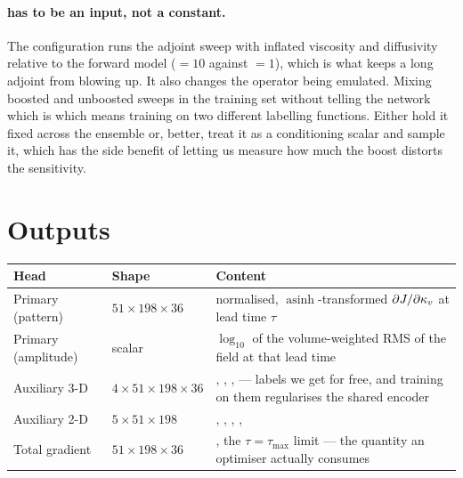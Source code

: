 \paragraph{ has to be an input, not a constant.}
The  configuration runs the adjoint sweep with inflated
viscosity and diffusivity relative to the forward model
(${}=10$ against ${}=1$), which is what
keeps a long adjoint from blowing up. It also changes the operator being
emulated. Mixing boosted and unboosted sweeps in the training set without
telling the network which is which means training on two different labelling
functions. Either hold it fixed across the ensemble or, better, treat it as a
conditioning scalar and sample it, which has the side benefit of letting us
measure how much the boost distorts the sensitivity.

\section{Outputs}

\begin{center}
\begin{tabularx}{\textwidth}{@{}Y{0.65}Y{0.7}Y{1.65}@{}}
\toprule
\textbf{Head} & \textbf{Shape} & \textbf{Content}\\
\midrule
Primary (pattern) & $51\times198\times36$
  & normalised, $\operatorname{asinh}$-transformed
    $\partial J/\partial\kappa_{v}$ at lead time $\tau$\\
Primary (amplitude) & scalar
  & $\log_{10}$ of the volume-weighted RMS of the field at that lead time\\
Auxiliary 3-D & $4\times51\times198\times36$
  & , , ,  --- labels
    we get for free, and training on them regularises the shared encoder\\
Auxiliary 2-D & $5\times51\times198$
  & , , , ,
    \\
Total gradient & $51\times198\times36$
  & , the $\tau=\tau_{\max}$ limit --- the quantity an
    optimiser actually consumes\\
\bottomrule
\end{tabularx}
\end{center}

